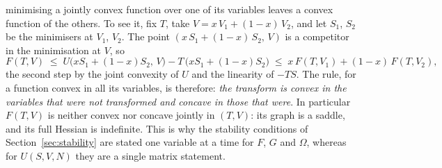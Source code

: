 \documentclass[10pt,a4paper]{article}
\theoremstyle{remark}
\begin{document}
minimising a jointly convex function over one of its variables leaves a convex
function of the others. To see it, fix $T$, take $V=x\,V_1+(1-x)\,V_2$, and
let $S_1$, $S_2$ be the minimisers at $V_1$, $V_2$. The point
$(x\,S_1+(1-x)\,S_2,\,V)$ is a competitor in the minimisation at $V$, so
\[
  F(T,V)\;\leq\;U\big(xS_1+(1-x)S_2,\,V\big)-T\,\big(xS_1+(1-x)S_2\big)
  \;\leq\;x\,F(T,V_1)+(1-x)\,F(T,V_2) ,
\]
the second step by the joint convexity of $U$ and the linearity of $-TS$.
The rule, for a function convex in all its variables, is therefore:
\emph{the transform is convex in the variables that were not transformed and
concave in those that were}. In particular $F(T,V)$ is neither convex nor
concave jointly in $(T,V)$: its graph is a saddle, and its full Hessian is
indefinite. This is why the stability conditions of
Section~\ref{sec:stability} are stated one variable at a time for $F$, $G$
and $\Omega$, whereas for $U(S,V,N)$ they are a single matrix statement.
\end{document}
